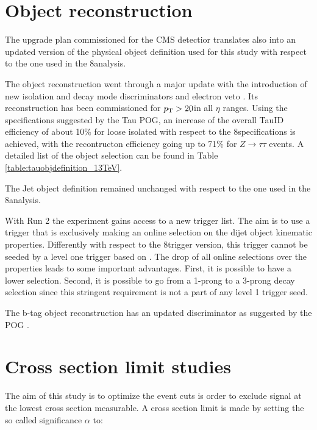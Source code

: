 \section{Object reconstruction}

The upgrade plan commissioned for the CMS detectior translates also into an updated version of the physical object definition used for this study with respect to the one used in the 8\tev analysis.

The \hadtau object reconstruction went through a major update with the introduction of new isolation and decay mode discriminators and electron veto \cite{bib:TauID_13tev}. Its reconstruction has been commissioned for $p_{\text{T}} > 20$\gev in all $\eta$ ranges. Using the specifications suggested by the Tau POG, an increase of the overall TauID efficiency of about 10\% for loose isolated \hadtau with respect to the 8\tev specifications is achieved, with the recontructon efficiency going up to 71\% for $Z \longrightarrow\tau\tau$ events\cite{bib:TauID_13tev}. A detailed list of the \hadtau object selection can be found in Table \ref{table:tauobjdefinition_13TeV}. 

The Jet object definition remained unchanged with respect to the one used in the 8\tev analysis.  

With Run 2 the experiment gains access to a new trigger list. The aim is to use a trigger that is exclusively making an online selection on the dijet object kinematic properties. Differently with respect to the 8\tev trigger version, this trigger cannot be seeded by a level one trigger based on \met. The drop of all online selections over the \hadtau properties leads to some important advantages. First, it is possible to have a lower \hadtau \pt selection. Second, it is possible to go from a 1-prong to a 3-prong decay selection since this stringent requirement is not a part of any level 1 trigger seed. 

The b-tag object reconstruction has an updated discriminator as suggested by the POG \cite{bib:BJetID_13tev}.

\section{Cross section limit studies}

The aim of this study is to optimize the event cuts is order to exclude signal at the lowest cross section measurable. A cross section limit is made by setting the so called significance $\alpha$ to:

